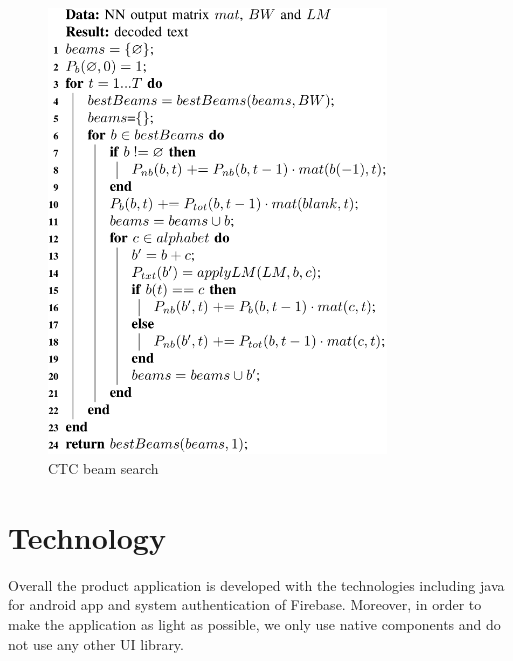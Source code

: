 \begin{figure}[H]
	\centering
	\includegraphics[width=0.8\textwidth]{img/Chap3/BS_CTC}
	\caption{ CTC beam search }
	\label{fig:Chap3-BS_CTC}
\end{figure}

\newpage
\section{Technology}
Overall the product application is developed with the technologies including java for android app and system authentication of Firebase. Moreover, in order to make the application as light as possible, we only use native components and do not use any other UI library.



